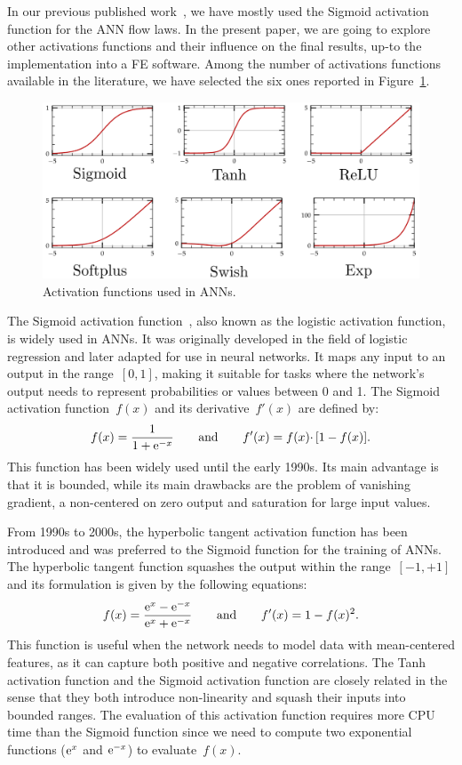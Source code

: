 \documentclass[algorithms,article,submit,pdftex,oneauthors]{Definitions/mdpi}
\DeclareRobustCommand{\e}[1]{{\rm e}^{#1}}
\begin{document}
In our previous published work~\cite{Pantale-2021-EIN, Pantale-2023-DIA}, we have mostly used the Sigmoid activation function for the ANN flow laws.
In the present paper, we are going to explore other activations functions and their influence on the final results, up-to the implementation into a FE software.
Among the number of activations functions available in the literature, we have selected the six ones reported in Figure~\ref{fig:ActFunctions}.
\begin{figure}[h!]
\centering
\includegraphics[width=0.8\columnwidth]{Figures/ActFunctions}
\caption{Activation functions used in ANNs.}
\label{fig:ActFunctions}
\end{figure}

The Sigmoid activation function~\cite{Han-1995-ISF}, also known as the logistic activation function, is widely used in ANNs.
It was originally developed in the field of logistic regression and later adapted for use in neural networks.
It maps any input to an output in the range~$[0,1]$, making it suitable for tasks where the network's output needs to represent probabilities or values between 0 and 1.
The Sigmoid activation function~$f(x)$ and its derivative~$f'(x)$ are defined by:
\begin{equation}
f(x) = \frac{1}{1+\e{-x}}\qquad \text{and}\qquad f'(x) = f(x)\cdotp\left[1-f(x)\right].\label{eq:act-sig}
\end{equation}
This function has been widely used until the early 1990s.
Its main advantage is that it is bounded, while its main drawbacks are the problem of vanishing gradient, a non-centered on zero output and saturation for large input values.

From 1990s to 2000s, the hyperbolic tangent activation function has been introduced and was preferred to the Sigmoid function for the training of ANNs.
The hyperbolic tangent function squashes the output within the range~$[-1,+1]$ and its formulation is given by the following equations:
\begin{equation}
f(x) = \frac{\e{x} - \e{-x}}{\e{x} + \e{-x}}\qquad \text{and}\qquad f'(x) = 1 - f(x)^2.\label{eq:act-tanh}
\end{equation}
This function is useful when the network needs to model data with mean-centered features, as it can capture both positive and negative correlations.
The Tanh activation function and the Sigmoid activation function are closely related in the sense that they both introduce non-linearity and squash their inputs into bounded ranges.
The evaluation of this activation function requires more CPU time than the Sigmoid function since we need to compute two exponential functions ($\e{x}$ and $\e{-x}$) to evaluate~$f(x)$.
\end{document}
